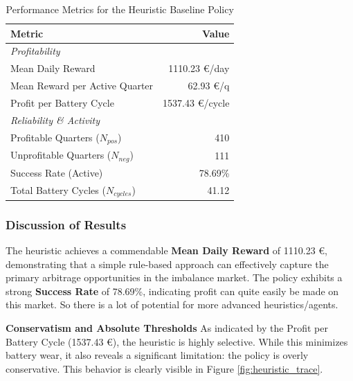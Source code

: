             \begin{table}[h]
                \centering
                \renewcommand{\arraystretch}{1.2} 
                \begin{tabular}{l r}
                    \hline
                        \textbf{Metric} & \textbf{Value} \\
                        \hline
                        \multicolumn{2}{l}{\textit{Profitability}} \\
                        Mean Daily Reward & 1110.23 €/day \\
                        Mean Reward per Active Quarter & 62.93 €/q \\
                        Profit per Battery Cycle & 1537.43 €/cycle \\
                        \hline
                        \multicolumn{2}{l}{\textit{Reliability \& Activity}} \\
                        Profitable Quarters ($N_{pos}$) & 410 \\
                        Unprofitable Quarters ($N_{neg}$) & 111 \\
                        Success Rate (Active) & 78.69\% \\
                        Total Battery Cycles ($N_{cycles}$) & 41.12 \\
                        \hline
                    \end{tabular}
                    \caption{Performance Metrics for the Heuristic Baseline Policy}
                    \label{tab:heuristic_results}
                \end{table}
                
        \subsubsection{Discussion of Results}
            The heuristic achieves a commendable \textbf{Mean Daily Reward} of 1110.23 €, demonstrating that a simple rule-based approach can effectively capture the primary arbitrage opportunities in the imbalance market. The policy exhibits a strong \textbf{Success Rate} of 78.69\%, indicating profit can quite easily be made on this market. So there is a lot of potential for more advanced heuristics/agents. 
                
                \textbf{Conservatism and Absolute Thresholds}
                As indicated by the Profit per Battery Cycle (1537.43 €), the heuristic is highly selective. While this minimizes battery wear, it also reveals a significant limitation: the policy is overly conservative. This behavior is clearly visible in Figure \ref{fig:heuristic_trace}. 
                
